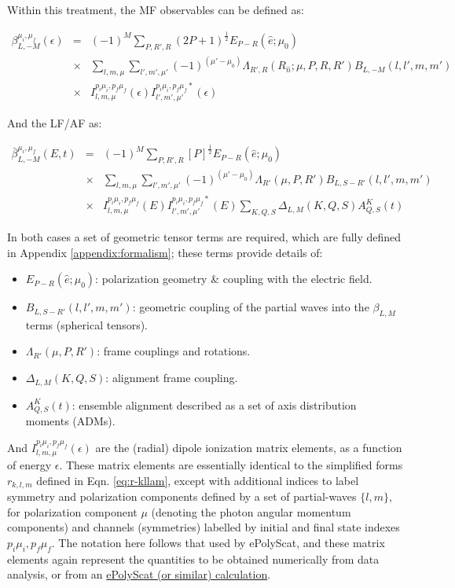 Within this treatment, the MF observables can be defined as:

\begin{eqnarray}
\beta_{L,-M}^{\mu_{i},\mu_{f}}(\epsilon) & = & (-1)^{M}\sum_{P,R',R}(2P+1)^{\frac{1}{2}}{E_{P-R}(\hat{e};\mu_{0})}\\
 & \times &\sum_{l,m,\mu}\sum_{l',m',\mu'}(-1)^{(\mu'-\mu_{0})}{\Lambda_{R',R}(R_{\hat{n}};\mu,P,R,R')B_{L,-M}(l,l',m,m')}\\
 & \times & I_{l,m,\mu}^{p_{i}\mu_{i},p_{f}\mu_{f}}(\epsilon)I_{l',m',\mu'}^{p_{i}\mu_{i},p_{f}\mu_{f}*}(\epsilon)\label{eq:BLM-tensor-MF}
\end{eqnarray}

And the LF/AF as:

\begin{eqnarray}
\bar{\beta}_{L,-M}^{\mu_{i},\mu_{f}}(E,t) & = & (-1)^{M}\sum_{P,R',R}{[P]^{\frac{1}{2}}}{E_{P-R}(\hat{e};\mu_{0})}\\
 & \times &\sum_{l,m,\mu}\sum_{l',m',\mu'}(-1)^{(\mu'-\mu_{0})}{\Lambda_{R'}(\mu,P,R')B_{L,S-R'}(l,l',m,m')}\\
 & \times &I_{l,m,\mu}^{p_{i}\mu_{i},p_{f}\mu_{f}}(E)I_{l',m',\mu'}^{p_{i}\mu_{i},p_{f}\mu_{f}*}(E)\sum_{K,Q,S}\Delta_{L,M}(K,Q,S)A_{Q,S}^{K}(t)\label{eq:BLM-tensor-AF}
\end{eqnarray}

In both cases a set of geometric tensor terms are required, which are fully defined in Appendix \ref{appendix:formalism}; these terms provide details of:

\begin{itemize}
\item ${E_{P-R}(\hat{e};\mu_{0})}$: polarization geometry \& coupling with the electric field.
\item $B_{L,S-R'}(l,l',m,m')$: geometric coupling of the partial waves into the $\beta_{L,M}$ terms (spherical tensors).
\item $\Lambda_{R'}(\mu,P,R')$: frame couplings and rotations.
\item $\Delta_{L,M}(K,Q,S)$: alignment frame coupling.
\item $A_{Q,S}^{K}(t)$: ensemble alignment described as a set of axis distribution moments (ADMs).
\end{itemize}

And \(I_{l,m,\mu}^{p_{i}\mu_{i},p_{f}\mu_{f}}(\epsilon)\) are the (radial) dipole ionization matrix elements, as a function of energy \(\epsilon\). These matrix elements are essentially identical to the simplified forms $r_{k,l,m}$ defined in Eqn. \ref{eq:r-kllam}, except with additional indices to label symmetry and polarization components
defined by a set of partial-waves \(\{l,m\}\), for polarization component \(\mu\) (denoting the photon angular momentum components) and channels (symmetries) labelled by initial and final state indexes \({p_{i}\mu_{i},p_{f}\mu_{f}}\). The notation here follows that used by ePolyScat, and these matrix elements again represent the quantities  to be obtained numerically from data analysis, or from an \href{https://epsproc.readthedocs.io/en/latest/ePS_ePSproc_tutorial/ePS_tutorial_080520.html\#Theoretical-background}{ePolyScat (or similar) calculation}. 

